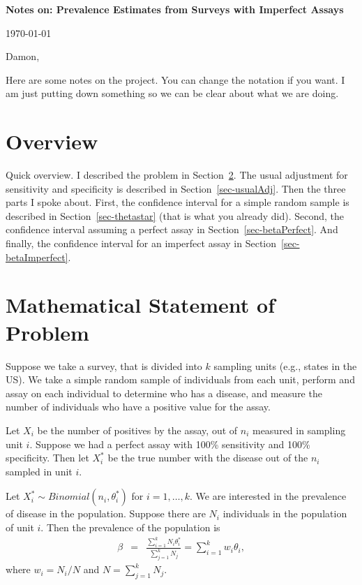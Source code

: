 \documentclass{article}
\begin{document}
{\bf \large Notes on: Prevalence Estimates from Surveys with Imperfect Assays}

\today



Damon,

Here are some notes on the project. You can change the notation if you want. I am just putting down something so we can be clear about what we are doing.

\section{Overview}

Quick overview. I described the problem in Section~\ref{sec-math}. The usual adjustment for sensitivity and specificity is described in Section~\ref{sec-usualAdj}. Then the three parts I spoke about. First, the confidence interval for a simple random sample is described in Section~\ref{sec-thetastar} (that is what you already did). Second, the confidence interval assuming a perfect assay in Section~\ref{sec-betaPerfect}. And finally, the 
confidence interval for an imperfect assay in Section~\ref{sec-betaImperfect}. 


\section{Mathematical Statement of Problem}
\label{sec-math}

Suppose we take a survey, that is divided into $k$ sampling units (e.g., states in the US).
We take a simple random sample of individuals from each unit, perform and assay on each individual to determine who has a disease, and measure the number of individuals who have a positive value for the assay.

Let $X_i$ be the number of positives by the assay, out of $n_i$ measured in sampling unit $i$.
Suppose we had a perfect assay with 100\% sensitivity and 100\% specificity. Then let $X_i^*$ be the true number with the disease out of the $n_i$ sampled in unit $i$.

Let $X_i^* \sim Binomial(n_i, \theta_i^*)$ for $i=1,\ldots,k$. We are interested in the prevalence of disease in the population. Suppose there are $N_i$ individuals in the population of unit $i$. Then the prevalence of the population is
\begin{eqnarray*}
\beta & = & \frac{ \sum_{i=1}^{k} N_i \theta_i^* }{ \sum_{j=1}^{k} N_j }  =  \sum_{i=1}^{k} w_i \theta_i,
\end{eqnarray*}
where $w_i = N_i/N$ and $N=\sum_{j=1}^{k} N_j$.
\end{document}
